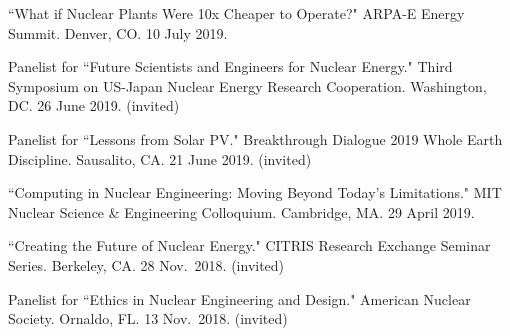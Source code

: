 \begin{bibsection}
\item ``What if Nuclear Plants Were 10x Cheaper to Operate?"
ARPA-E Energy Summit. Denver, CO. 10 July 2019.

\item Panelist for ``Future Scientists and Engineers for Nuclear Energy." Third Symposium on US-Japan Nuclear Energy Research Cooperation. Washington, DC. 26 June 2019. (invited)

\item Panelist for ``Lessons from Solar PV." Breakthrough Dialogue 2019 Whole Earth Discipline. Sausalito, CA. 21 June 2019. (invited)




\item ``Computing in Nuclear Engineering: Moving Beyond Today's Limitations." MIT Nuclear Science \& Engineering Colloquium. Cambridge, MA. 29 April 2019.



\item ``Creating the Future of Nuclear Energy." CITRIS Research Exchange Seminar Series. Berkeley, CA. 28 Nov.\ 2018. (invited)


\item Panelist for ``Ethics in Nuclear Engineering and Design." American Nuclear Society. Ornaldo, FL. 13 Nov.\ 2018. (invited)


\end{bibsection}
